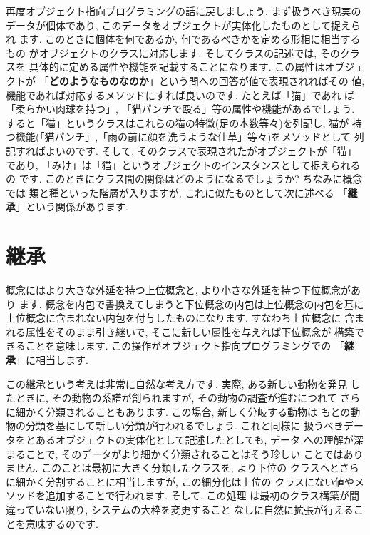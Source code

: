 \documentclass[b5j,8pt,twocolumn]{ltjsarticle}
\begin{document}
再度オブジェクト指向プログラミングの話に戻しましょう. まず扱うべき現実の
データが個体であり, このデータをオブジェクトが実体化したものとして捉えられ
ます. このときに個体を何であるか, 何であるべきかを定める形相に相当するもの
がオブジェクトのクラスに対応します. そしてクラスの記述では, そのクラスを
具体的に定める属性や機能を記載することになります. この属性はオブジェクトが
「\textbf{どのようなものなのか}」という問への回答が値で表現されればその
値,  機能であれば対応するメソッドにすれば良いのです. たとえば「猫」であれ
ば「柔らかい肉球を持つ」, 「猫パンチで殴る」等の属性や機能があるでしょう.
 すると「猫」というクラスはこれらの猫の特徴(足の本数等々)を列記し, 猫が
持つ機能(「猫パンチ」,「雨の前に顔を洗うような仕草」等々)をメソッドとして
列記すればよいのです. そして, そのクラスで表現されたがオブジェクトが「猫」
であり, 「みけ」は「猫」というオブジェクトのインスタンスとして捉えられるの
です. このときにクラス間の関係はどのようになるでしょうか? ちなみに概念では
類と種といった階層が入りますが, これに似たものとして次に述べる
「\textbf{継承}」という関係があります.


\section{継承}


概念にはより大きな外延を持つ上位概念と, より小さな外延を持つ下位概念があり
ます. 概念を内包で書換えてしまうと下位概念の内包は上位概念の内包を基に
上位概念に含まれない内包を付与したものになります. すなわち上位概念に
含まれる属性をそのまま引き継いで, そこに新しい属性を与えれば下位概念が
構築できることを意味します. この操作がオブジェクト指向プログラミングでの
「\textbf{継承}」に相当します.
\newline


この継承という考えは非常に自然な考え方です. 実際, ある新しい動物を発見
したときに, その動物の系譜が創られますが, その動物の調査が進むにつれて
さらに細かく分類されることもあります. この場合, 新しく分岐する動物は
もとの動物の分類を基にして新しい分類が行われるでしょう. これと同様に
扱うべきデータをとあるオブジェクトの実体化として記述したとしても, データ
への理解が深まることで, そのデータがより細かく分類されることはそう珍しい
ことではありません. このことは最初に大きく分類したクラスを, より下位の
クラスへとさらに細かく分割することに相当しますが, この細分化は上位の
クラスにない値やメソッドを追加することで行われます. そして, この処理
は最初のクラス構築が間違っていない限り, システムの大枠を変更すること
なしに自然に拡張が行えることを意味するのです.
\newline
\end{document}

